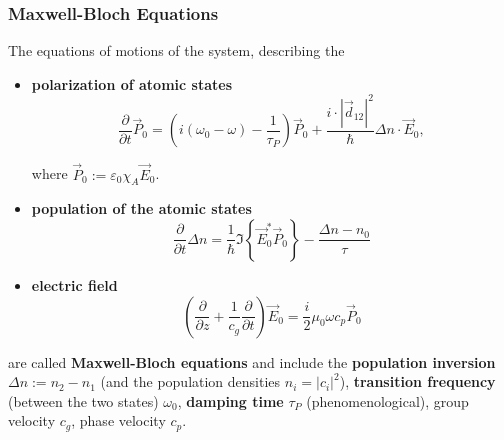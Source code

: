 \documentclass{article}
\newcommand{\lr}[1]{\left(#1\right)}
\newcommand{\lrschweif}[1]{\left\{#1\right\}}
\begin{document}
\subsubsection{Maxwell-Bloch Equations}
The equations of motions of the system, describing the
	\begin{itemize}
		\item \textbf{polarization of atomic states}
			\begin{equation}
				\frac{\partial}{\partial t}\vec{P}_0 = \lr{ i(\omega_0 - \omega) - \frac{1}{\tau_P} } \vec{P}_0 + \frac{i\cdot|\vec{d}_{12}|^2}{\hbar} \Delta n \cdot \vec{E}_0,
			\end{equation}

		where $\vec{P}_0 := \varepsilon_0\chi_A \vec{E}_0$.


		\item \textbf{population of the atomic states}
			\begin{equation}
				\frac{\partial}{\partial t} \Delta n = \frac{1}{\hbar} \Im\lrschweif{ \vec{E}_0^* \vec{P}_0 } - \frac{\Delta n - n_0}{\tau}
			\end{equation}


		\item \textbf{electric field}
			\begin{equation}
				\lr{ \frac{\partial}{\partial z} + \frac{1}{c_g}\frac{\partial}{\partial t} }\vec{E}_0 = \frac{i}{2}\mu_0 \omega c_p \vec{P}_0
			\end{equation}
	\end{itemize}

are called \textbf{Maxwell-Bloch equations} and include the \textbf{population inversion} $\Delta n := n_2 - n_1$ \textcolor{gruen}{(and the population densities $n_i = |c_i|^2$)}, \textbf{transition frequency} (between the two states) $\omega_0$, \textbf{damping time} $\tau_P$ \textcolor{gruen}{(phenomenological)}, group velocity $c_g$, phase velocity $c_p$.


\newpage
\end{document}
